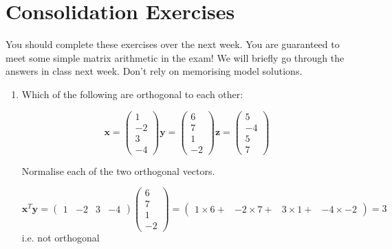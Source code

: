 \documentclass{article}
\begin{document}
\section{Consolidation Exercises}

You should complete these exercises over the next week.   You are guaranteed to meet some simple matrix arithmetic in the exam!   We will briefly go through the answers in class next week.   Don't rely on memorising model solutions.

\begin{enumerate}
\item Which of the following are orthogonal to each other:

\begin{displaymath}
\boldsymbol{x} = \left( \begin{array}{r} 1 \\ -2 \\ 3 \\ -4 \end{array} \right)
\boldsymbol{y} = \left( \begin{array}{r} 6 \\ 7 \\ 1 \\ -2 \end{array} \right)
\boldsymbol{z} = \left( \begin{array}{r} 5 \\ -4 \\ 5 \\ 7 \end{array} \right)
\end{displaymath}

Normalise each of the two orthogonal vectors.


\begin{displaymath}
\boldsymbol{x}^{T}\boldsymbol{y} = \left( \begin{array}{rrrr}1 & -2 & 3 & -4 \end{array} \right) \left( \begin{array}{r} 6 \\ 7 \\ 1 \\ -2 \end{array} \right) = \left( \begin{array}{rrrr} 1 \times 6 + & -2 \times 7 + & 3 \times 1 + & -4 \times -2 \end{array} \right) = 3
\end{displaymath}
i.e. not orthogonal


\end{enumerate}
\end{document}
